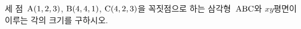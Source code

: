 세 점~$\mathrm{A}(1{,}\mkern3mu\mathopen{}2{,}\mkern3mu\mathopen{}3)$, $\mathrm{B}(4{,}\mkern3mu\mathopen{}4{,}\mkern3mu\mathopen{}1)$, $\mathrm{C}(4{,}\mkern3mu\mathopen{}2{,}\mkern3mu\mathopen{}3)$을 꼭짓점으로 하는 삼각형~$\mathrm{ABC}$와 $xy$평면이 이루는 각의 크기를 구하시오.

